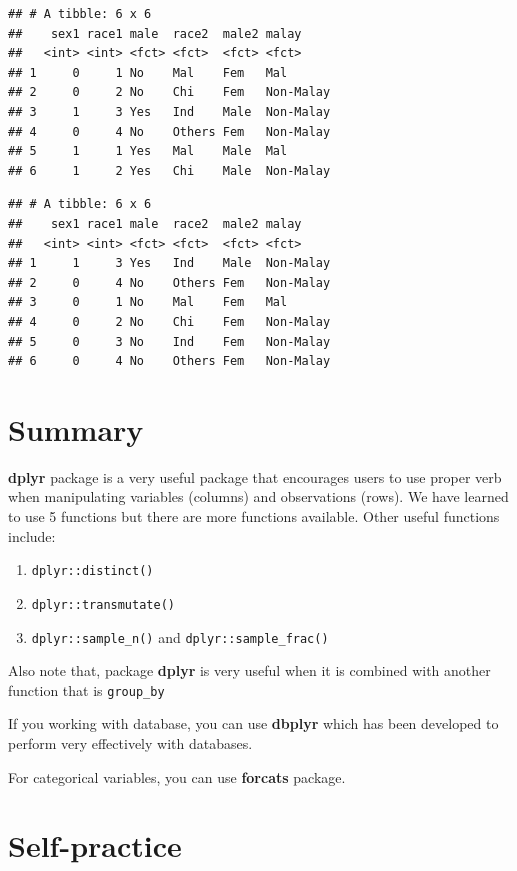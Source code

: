 \documentclass[
]{book}
\providecommand{\tightlist}{%
  \setlength{\itemsep}{0pt}\setlength{\parskip}{0pt}}
\begin{document}
\begin{verbatim}
## # A tibble: 6 x 6
##    sex1 race1 male  race2  male2 malay    
##   <int> <int> <fct> <fct>  <fct> <fct>    
## 1     0     1 No    Mal    Fem   Mal      
## 2     0     2 No    Chi    Fem   Non-Malay
## 3     1     3 Yes   Ind    Male  Non-Malay
## 4     0     4 No    Others Fem   Non-Malay
## 5     1     1 Yes   Mal    Male  Mal      
## 6     1     2 Yes   Chi    Male  Non-Malay
\end{verbatim}

\begin{verbatim}
## # A tibble: 6 x 6
##    sex1 race1 male  race2  male2 malay    
##   <int> <int> <fct> <fct>  <fct> <fct>    
## 1     1     3 Yes   Ind    Male  Non-Malay
## 2     0     4 No    Others Fem   Non-Malay
## 3     0     1 No    Mal    Fem   Mal      
## 4     0     2 No    Chi    Fem   Non-Malay
## 5     0     3 No    Ind    Fem   Non-Malay
## 6     0     4 No    Others Fem   Non-Malay
\end{verbatim}

\hypertarget{summary}{%
\section{Summary}\label{summary}}

\textbf{dplyr} package is a very useful package that encourages users to use proper verb when manipulating variables (columns) and observations (rows). We have learned to use 5 functions but there are more functions available. Other useful functions include:

\begin{enumerate}
\def\labelenumi{\arabic{enumi}.}
\tightlist
\item
  \texttt{dplyr::distinct()}
\item
  \texttt{dplyr::transmutate()}
\item
  \texttt{dplyr::sample\_n()} and \texttt{dplyr::sample\_frac()}
\end{enumerate}

Also note that, package \textbf{dplyr} is very useful when it is combined with another function that is \texttt{group\_by}

If you working with database, you can use \textbf{dbplyr} which has been developed to perform very effectively with databases.

For categorical variables, you can use \textbf{forcats} package.

\hypertarget{self-practice}{%
\section{Self-practice}\label{self-practice}}
\end{document}
